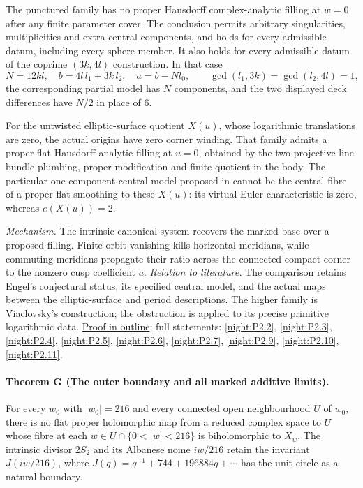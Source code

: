 The punctured family has no proper Hausdorff complex-analytic
filling at $w=0$ after any finite parameter cover.  The conclusion
permits arbitrary singularities, multiplicities and extra central
components, and holds for every admissible datum, including every
sphere member.  It also holds for every admissible datum of the
coprime $(3k,4l)$ construction.  In that case
\[
 N=12kl,\quad b=4l\,l_1+3k\,l_2,\quad a=b-Nl_0,
 \qquad \gcd(l_1,3k)=\gcd(l_2,4l)=1,
\]
the corresponding partial model has $N$ components, and the two
displayed deck differences have $N/2$ in place of 6.

For the untwisted elliptic-surface quotient $X(u)$, whose
logarithmic translations are zero, the actual origins have zero
corner winding.  That family admits a proper flat Hausdorff
analytic filling at $u=0$, obtained by the two-projective-line-bundle
plumbing, proper modification and finite quotient in the body.
The particular one-component central model proposed in
\cite[Conjecture~8.2, p.~22]{Engel2026} cannot be the central
fibre of a proper flat smoothing to these $X(u)$: its virtual
Euler characteristic is zero, whereas $e(X(u))=2$.

\textit{Mechanism.} The intrinsic canonical system recovers the
marked base over a proposed filling.  Finite-orbit vanishing kills
horizontal meridians, while commuting meridians propagate their
ratio across the connected compact corner to the nonzero cusp
coefficient $a$.
\textit{Relation to literature.} The comparison retains Engel's
conjectural status, its specified central model, and the actual
maps between the elliptic-surface and period descriptions.  The
higher family is Viaclovsky's construction; the obstruction is
applied to its precise primitive logarithmic data.
\hyperlink{outline-I-F}{Proof in outline}; full statements:
\ref{night:P2.2}, \ref{night:P2.3}, \ref{night:P2.4},
\ref{night:P2.5}, \ref{night:P2.6}, \ref{night:P2.7},
\ref{night:P2.9}, \ref{night:P2.10}, \ref{night:P2.11}.

\hypertarget{main-I-G}{}
\paragraph{Theorem G (The outer boundary and all marked additive limits).}
\label{series:I:G}
For every $w_0$ with $|w_0|=216$ and every connected open
neighbourhood $U$ of $w_0$, there is no flat proper holomorphic
map from a reduced complex space to $U$ whose fibre at each
$w\in U\cap\{0<|w|<216\}$ is biholomorphic to $X_w$.
The intrinsic divisor $2S_2$ and its Albanese nome $iw/216$
retain the invariant $J(iw/216)$, where
$J(q)=q^{-1}+744+196884q+\cdots$ has the unit circle as a
natural boundary.

